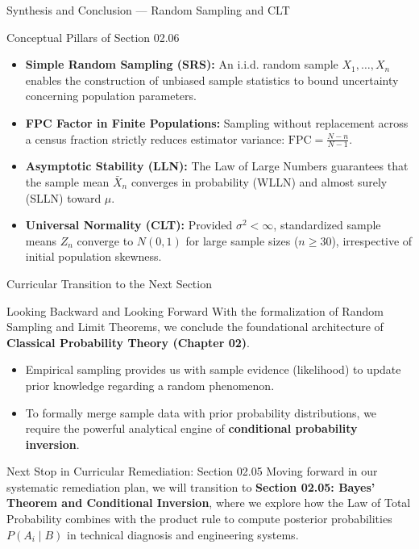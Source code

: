 \documentclass[10pt, aspectratio=169]{beamer}
\begin{document}
\begin{frame}{Synthesis and Conclusion --- Random Sampling and CLT}
  \fontsize{7.5pt}{9pt}\selectfont
  \begin{block}{Conceptual Pillars of Section 02.06}
    \fontsize{7.5pt}{9pt}\selectfont
    \begin{itemize}\itemsep=0.12cm
      \item \textbf{Simple Random Sampling (SRS):} An i.i.d. random sample $X_1, \ldots, X_n$ enables the construction of unbiased sample statistics to bound uncertainty concerning population parameters.
      \item \textbf{FPC Factor in Finite Populations:} Sampling without replacement across a census fraction strictly reduces estimator variance: $\text{FPC} = \frac{N-n}{N-1}$.
      \item \textbf{Asymptotic Stability (LLN):} The Law of Large Numbers guarantees that the sample mean $\bar{X}_n$ converges in probability (WLLN) and almost surely (SLLN) toward $\mu$.
      \item \textbf{Universal Normality (CLT):} Provided $\sigma^2 < \infty$, standardized sample means $Z_n$ converge to $N(0,1)$ for large sample sizes ($n \ge 30$), irrespective of initial population skewness.
    \end{itemize}
  \end{block}
\end{frame}

\begin{frame}{Curricular Transition to the Next Section}
  \fontsize{7.5pt}{9pt}\selectfont
  \begin{block}{Looking Backward and Looking Forward}
    \fontsize{7.5pt}{9pt}\selectfont
    With the formalization of Random Sampling and Limit Theorems, we conclude the foundational architecture of \textbf{Classical Probability Theory (Chapter 02)}.
    \begin{itemize}\itemsep=0.1cm
      \item Empirical sampling provides us with sample evidence (likelihood) to update prior knowledge regarding a random phenomenon.
      \item To formally merge sample data with prior probability distributions, we require the powerful analytical engine of \textbf{conditional probability inversion}.
    \end{itemize}
  \end{block}
  \vspace{-0.15cm}
  \pause
  \begin{alertblock}{Next Stop in Curricular Remediation: Section 02.05}
    \fontsize{7.5pt}{9pt}\selectfont
    Moving forward in our systematic remediation plan, we will transition to \textbf{Section 02.05: Bayes' Theorem and Conditional Inversion}, where we explore how the Law of Total Probability combines with the product rule to compute posterior probabilities $P(A_i \mid B)$ in technical diagnosis and engineering systems.
  \end{alertblock}
\end{frame}
\end{document}
